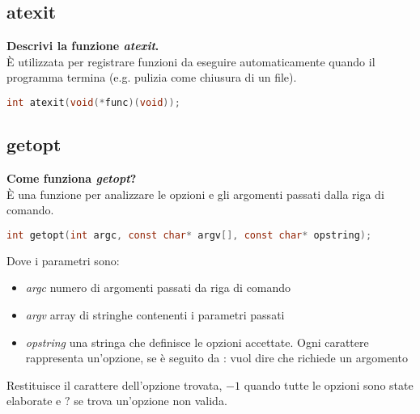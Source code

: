 \documentclass[a4paper,10pt]{article}
\theoremstyle{remark}
\theoremstyle{definition}
\theoremstyle{plain}
\theoremstyle{definition}
\theoremstyle{definition}
\theoremstyle{definition}
\theoremstyle{plain}
\theoremstyle{plain}
\begin{document}
\begin{itemize}
	\subsection{atexit}
	\textbf{Descrivi la funzione \textit{atexit}.}\\
	È utilizzata per registrare funzioni da eseguire automaticamente quando il programma termina (e.g. pulizia come chiusura di un file). 
	\begin{lstlisting}[language=C]
		int atexit(void(*func)(void));
	\end{lstlisting}
	\newpage
	\subsection{getopt}
	\textbf{Come funziona \textit{getopt}?}\\
	È una funzione per analizzare le opzioni e gli argomenti passati dalla riga di comando.
	\begin{lstlisting}[language=C]
		int getopt(int argc, const char* argv[], const char* opstring);
	\end{lstlisting}
	Dove i parametri sono:
	\begin{itemize}
		\item \textit{argc} numero di argomenti passati da riga di comando
		\item \textit{argv} array di stringhe contenenti i parametri passati
		\item \textit{opstring} una stringa che definisce le opzioni accettate. Ogni carattere rappresenta un'opzione, se è seguito da : vuol dire che richiede un argomento
	\end{itemize}
	Restituisce il carattere dell'opzione trovata, $-1$ quando tutte le opzioni sono state elaborate e $?$ se trova un'opzione non valida.
\end{itemize}
\end{document}
